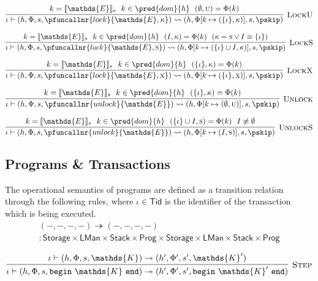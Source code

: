 \[
\infer[\textsc{LockU}]
{
	\iota \vdash (h, \Phi, s, \pfuncallnr{lock}{\mathds{E}, \kappa})
	\rightsquigarrow
	(h, \Phi[k \mapsto (\{\iota\}, \kappa)], s, \pskip)
}
{
	k = \llbracket \mathds{E} \rrbracket_s\ \
	k \in \pred{dom}{h}\ \
	(\emptyset, \textsc{u}) = \Phi(k)
}
\]

\[
\infer[\textsc{LockS}]
{
	\iota \vdash (h, \Phi, s, \pfuncallnr{lock}{\mathds{E}, \textsc{s}})
	\rightsquigarrow
	(h, \Phi[k \mapsto (\{\iota\} \cup I, \kappa)], s, \pskip)
}
{
	k = \llbracket \mathds{E} \rrbracket_s\ \
	k \in \pred{dom}{h}\ \
	(I, \kappa) = \Phi(k)\ \
	(\kappa = \textsc{s} \lor I \equiv \{\iota\})
}
\]

\[
\infer[\textsc{LockX}]
{
	\iota \vdash (h, \Phi, s, \pfuncallnr{lock}{\mathds{E}, \textsc{x}})
	\rightsquigarrow
	(h, \Phi[k \mapsto (\{\iota\}, \textsc{x})], s, \pskip)
}
{
	k = \llbracket \mathds{E} \rrbracket_s\ \
	k \in \pred{dom}{h}\ \
	(\{\iota\}, \kappa) = \Phi(k)
}
\]

\[
\infer[\textsc{Unlock}]
{
	\iota \vdash (h, \Phi, s, \pfuncallnr{unlock}{\mathds{E}})
	\rightsquigarrow
	(h, \Phi[k \mapsto (\emptyset, \textsc{u})], s, \pskip)
}
{
	k = \llbracket \mathds{E} \rrbracket_s\ \
	k \in \pred{dom}{h}\ \
	(\{\iota\}, \kappa) = \Phi(k)
}
\]

\[
\infer[\textsc{UnlockS}]
{
	\iota \vdash (h, \Phi, s, \pfuncallnr{unlock}{\mathds{E}})
	\rightsquigarrow
	(h, \Phi[k \mapsto (I, \textsc{s})], s, \pskip)
}
{
	k = \llbracket \mathds{E} \rrbracket_s\ \
	k \in \pred{dom}{h}\ \
	(\{\iota\} \cup I, \textsc{s}) = \Phi(k)\ \
	I \not\equiv \emptyset
}
\]

\subsection{Programs \& Transactions}
The operational semantics of programs are defined as a transition relation through the following rules, where $\iota \in \mathsf{Tid}$ is the identifier of the transaction which is being executed.
\begin{gather*}
(-, -, -, -) \twoheadrightarrow (-, -, -, -) \\: \mathsf{Storage} \times \mathsf{LMan} \times \mathsf{Stack} \times \mathsf{Prog} \times \mathsf{Storage} \times \mathsf{LMan} \times \mathsf{Stack} \times \mathsf{Prog}
\end{gather*}

\[
\infer[\textsc{Step}]
{
	\iota \vdash (h, \Phi, s, \mathtt{begin}\ \mathds{K}\ \mathtt{end})
	\twoheadrightarrow
	(h', \Phi', s', \mathtt{begin}\ \mathds{K}'\ \mathtt{end})
}
{
	\iota \vdash (h, \Phi, s, \mathds{K})
	\rightsquigarrow
	(h', \Phi', s', \mathds{K}')
}
\]


